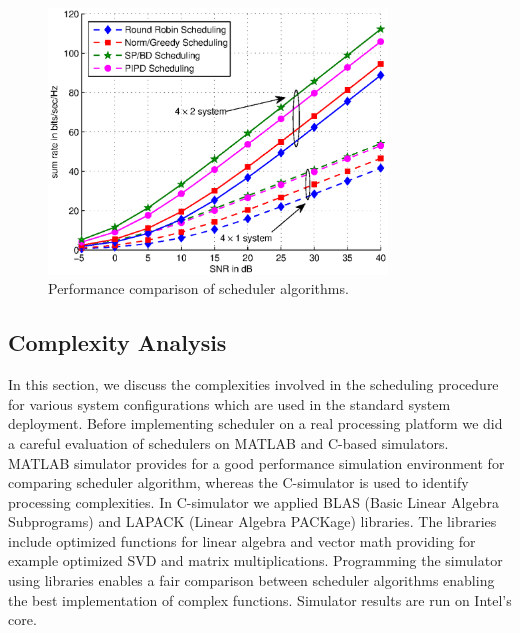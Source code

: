 \documentclass[conference]{./../../IEEE/IEEEtran}
\begin{document}
\begin{figure}
\centering
\includegraphics[width=9.0cm, angle=0]{performance_plots.eps}
\caption{Performance comparison of scheduler algorithms.}
\label{kuva:performance_plot}
\end{figure}

\subsection{Complexity Analysis}
In this section, we discuss the complexities involved in the scheduling procedure for various system configurations which
are used in the standard system deployment. Before implementing scheduler on a real processing platform we did a careful evaluation of schedulers on MATLAB and C-based simulators. MATLAB simulator provides for a good performance simulation environment for comparing scheduler algorithm, whereas the C-simulator is used to identify processing complexities. In C-simulator we applied BLAS (Basic Linear Algebra Subprograms) and LAPACK (Linear Algebra PACKage) libraries. The libraries include optimized functions for linear algebra and vector math providing for example optimized SVD and matrix multiplications. Programming the simulator using libraries enables a fair comparison between scheduler algorithms enabling the best implementation of complex functions. Simulator results are run on Intel's core.
\end{document}
